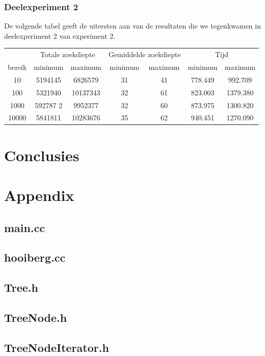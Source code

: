 \documentclass[a4paper,10pt]{article}
\begin{document}
\subsubsection{Deelexperiment 2}
De volgende tabel geeft de uitersten aan van de resultaten die we tegenkwamen in deelexperiment 2 van experiment 2. \\

\begin{center}
\begin{tabular}{c c c c c c c}
 & \multicolumn{2}{c}{Totale zoekdiepte} & \multicolumn{2}{c}{Gemiddelde zoekdiepte} & \multicolumn{2}{c}{Tijd}\\ 
bereik & minimum & maximum & minimum & maximum & minimum & maximum \\
10 & 5194145 & 6826579 & 31 &  41 & 778.449 & 992.709 \\
100 & 5321940 & 10137343 & 32 & 61 & 823.003 & 1379.380 \\
1000 & 592787 2& 9952377 & 32 & 60 & 873.975 & 1300.820 \\
10000 & 5841811 & 10283676 & 35 & 62 & 940.451 & 1270.090 \\
\end{tabular}
\end{center}
\section{Conclusies}

\section{Appendix}

\subsection{main.cc}

\subsection{hooiberg.cc}

\subsection{Tree.h}

\subsection{TreeNode.h}

\subsection{TreeNodeIterator.h}

\end{document}
